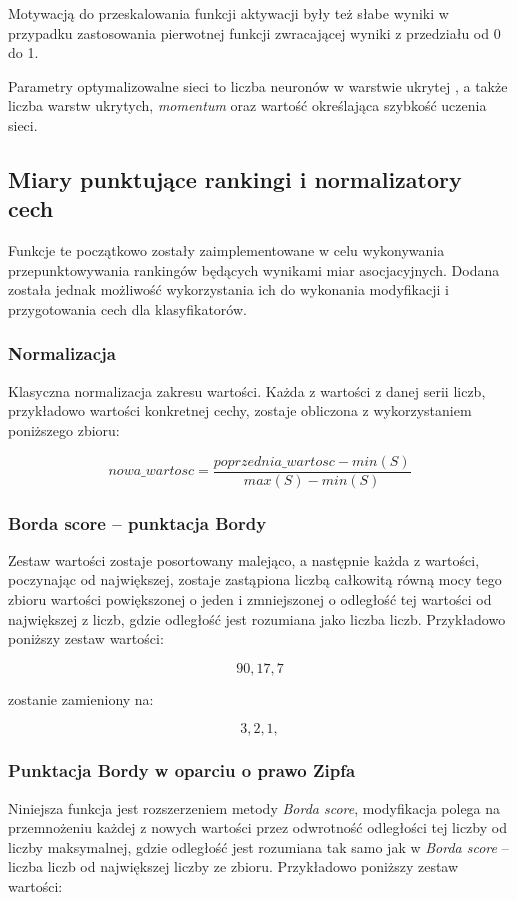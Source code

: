 \par
Motywacją do przeskalowania funkcji aktywacji były też słabe wyniki w przypadku zastosowania pierwotnej funkcji zwracającej wyniki z przedziału od 0 do 1.

\par
Parametry optymalizowalne sieci to liczba neuronów w warstwie ukrytej \cite{coling}, a także liczba warstw ukrytych, \emph{momentum} oraz wartość określająca szybkość uczenia sieci.


\subsection{Miary punktujące rankingi i normalizatory cech}
Funkcje te początkowo zostały zaimplementowane w celu wykonywania przepunktowywania rankingów będących wynikami miar asocjacyjnych.
Dodana została jednak możliwość wykorzystania ich do wykonania modyfikacji i przygotowania cech dla klasyfikatorów.

\subsubsection{Normalizacja}
Klasyczna normalizacja zakresu wartości.
Każda z wartości z danej serii liczb, przykładowo wartości konkretnej cechy, zostaje obliczona z wykorzystaniem poniższego zbioru:

$$ nowa\_wartosc = \frac{poprzednia\_wartosc - min(S)}{max(S) - min(S)} $$

\subsubsection{Borda score -- punktacja Bordy}
Zestaw wartości zostaje posortowany malejąco, a następnie każda z wartości, poczynając od największej, zostaje zastąpiona liczbą całkowitą równą mocy tego zbioru wartości powiększonej o jeden i zmniejszonej o odległość tej wartości od największej z liczb, gdzie odległość jest rozumiana jako liczba liczb. Przykładowo poniższy zestaw wartości:

$$ 90, 17, 7 $$

zostanie zamieniony na:

$$ 3, 2, 1, $$

\subsubsection{Punktacja Bordy w oparciu o prawo Zipfa}
Niniejsza funkcja jest rozszerzeniem metody \emph{Borda score}, modyfikacja polega na przemnożeniu każdej z nowych wartości przez odwrotność odległości tej liczby od liczby maksymalnej, gdzie odległość jest rozumiana tak samo jak w \emph{Borda score} -- liczba liczb od największej liczby ze zbioru. Przykładowo poniższy zestaw wartości:

